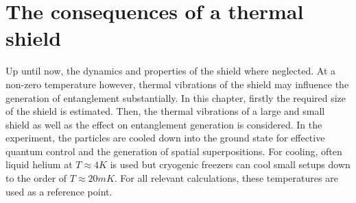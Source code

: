 \chapter{The consequences of a thermal shield}\label{cha:the-shield}
Up until now, the dynamics and properties of the shield where neglected. At a non-zero temperature however, thermal vibrations of the shield may influence the generation of entanglement substantially.
In this chapter, firstly the required size of the shield is estimated. Then, the thermal vibrations of a large and small shield as well as the effect on entanglement generation is considered.
In the experiment, the particles are cooled down into the ground state for effective quantum control and the generation of spatial superpositions.
For cooling, often liquid helium at $T\approx 4\si{K}$ is used but cryogenic freezers can cool small setups down to the order of $T\approx 20\si{mK}$.
For all relevant calculations, these temperatures are used as a reference point.









